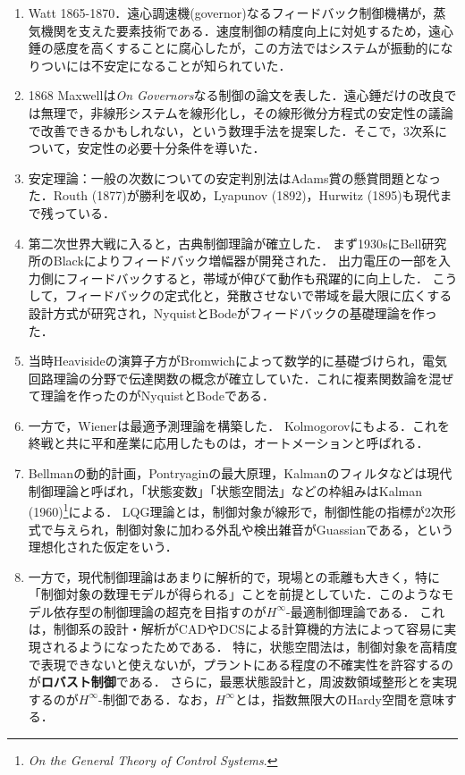 \documentclass[uplatex,dvipdfmx]{jsreport}
\begin{document}
\begin{history}[制御理論の歴史]\mbox{}
    \begin{enumerate}
        \item Watt 1865-1870．遠心調速機(governor)なるフィードバック制御機構が，蒸気機関を支えた要素技術である．速度制御の精度向上に対処するため，遠心錘の感度を高くすることに腐心したが，この方法ではシステムが振動的になりついには不安定になることが知られていた．
        \item 1868 Maxwellは\textit{On Governors}なる制御の論文を表した．遠心錘だけの改良では無理で，非線形システムを線形化し，その線形微分方程式の安定性の議論で改善できるかもしれない，という数理手法を提案した．そこで，3次系について，安定性の必要十分条件を導いた．
        \item 安定理論：一般の次数についての安定判別法はAdams賞の懸賞問題となった．Routh (1877)が勝利を収め，Lyapunov (1892)，Hurwitz (1895)も現代まで残っている．
        \item 第二次世界大戦に入ると，古典制御理論が確立した．
        まず1930sにBell研究所のBlackによりフィードバック増幅器が開発された．
        出力電圧の一部を入力側にフィードバックすると，帯域が伸びて動作も飛躍的に向上した．
        こうして，フィードバックの定式化と，発散させないで帯域を最大限に広くする設計方式が研究され，NyquistとBodeがフィードバックの基礎理論を作った．
        \item 当時Heavisideの演算子方がBromwichによって数学的に基礎づけられ，電気回路理論の分野で伝達関数の概念が確立していた．これに複素関数論を混ぜて理論を作ったのがNyquistとBodeである．
        \item 一方で，Wienerは最適予測理論を構築した．
        Kolmogorovにもよる．これを終戦と共に平和産業に応用したものは，オートメーションと呼ばれる．
        \item Bellmanの動的計画，Pontryaginの最大原理，Kalmanのフィルタなどは現代制御理論と呼ばれ，「状態変数」「状態空間法」などの枠組みはKalman (1960)\footnote{\textit{On the General Theory of Control Systems}.}による．
        LQG理論とは，制御対象が線形で，制御性能の指標が2次形式で与えられ，制御対象に加わる外乱や検出雑音がGuassianである，という理想化された仮定をいう．
        \item 一方で，現代制御理論はあまりに解析的で，現場との乖離も大きく，特に「制御対象の数理モデルが得られる」ことを前提としていた．このようなモデル依存型の制御理論の超克を目指すのが$H^\infty$-最適制御理論である．
        これは，制御系の設計・解析がCADやDCSによる計算機的方法によって容易に実現されるようになったためである．
        特に，状態空間法は，制御対象を高精度で表現できないと使えないが，プラントにある程度の不確実性を許容するのが\textbf{ロバスト制御}である．
        さらに，最悪状態設計と，周波数領域整形とを実現するのが$H^\infty$-制御である．なお，$H^\infty$とは，指数無限大のHardy空間を意味する．
    \end{enumerate}
\end{history}
\end{document}
